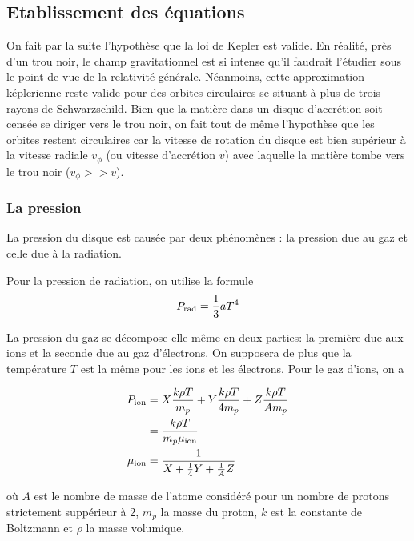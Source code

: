 \documentclass[a4paper,12pt]{article}
\begin{document}
\subsection{Etablissement des équations}

On fait par la suite l'hypothèse que la loi de Kepler est valide. En réalité, près d'un trou noir, le champ gravitationnel est si intense qu'il faudrait l'étudier sous le point de vue de la relativité générale. Néanmoins, cette approximation képlerienne reste valide pour des orbites circulaires se situant à plus de trois rayons de Schwarzschild.\newline
Bien que la matière dans un disque d’accrétion soit censée se diriger vers le trou noir, on fait tout de même l'hypothèse que les orbites restent circulaires car la vitesse de rotation du disque est bien supérieur à la vitesse radiale $v_{\phi}$ (ou vitesse d'accrétion $v$) avec laquelle la matière tombe vers le trou noir ($v_{\phi}>>v$).

\subsubsection{La pression}

La pression du disque est causée par deux phénomènes : la pression due au gaz et celle due à la radiation.

Pour la pression de radiation, on utilise la formule
\begin{equation}
    P_{\rm{rad}}=\frac{1}{3}aT^4
\end{equation}

La pression du gaz se décompose elle-même en deux parties: la première due aux ions et la seconde due au gaz d'électrons. On supposera de plus que la température $T$ est la même pour les ions et les électrons. Pour le gaz d'ions, on a 


\begin{align*}
    P_{\rm{ion}}& =X\frac{k\rho T}{m_p} + Y\frac{k\rho T}{4m_p} + Z\frac{k\rho T}{Am_p}\\
    & =\frac{k\rho T}{m_p \mu_{\rm{ion}}}\\
    \mu_{\rm{ion}} &=\frac{1}{X+\frac{1}{4}Y+\frac{1}{A}Z}
\end{align*}



où $A$ est le nombre de masse de l'atome considéré pour un nombre de protons strictement suppérieur à 2, $m_p$ la masse du proton, $k$ est la constante de Boltzmann et $\rho$ la masse volumique.
\end{document}
